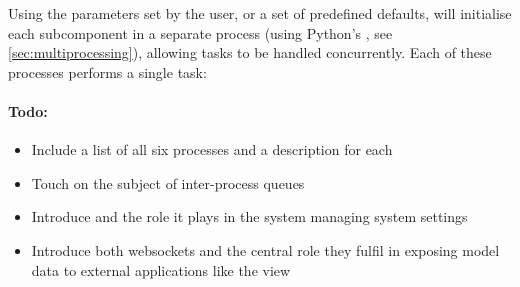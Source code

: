 \documentclass[a4paper, openany, oneside]{memoir}
\begin{document}
Using the parameters set by the user, or a set of predefined defaults,  will initialise each subcomponent in a separate process (using Python's , see \cref{sec:multiprocessing}), allowing tasks to be handled concurrently. Each of these processes performs a single task:



\paragraph{Todo:}
\begin{itemize}
	\item Include a list of all six processes and a description for each
	\item Touch on the subject of inter-process queues
	\item Introduce  and the role it plays in the system managing system settings
	\item Introduce both websockets and the central role they fulfil in exposing model data to external applications like the view
\end{itemize}
\end{document}
